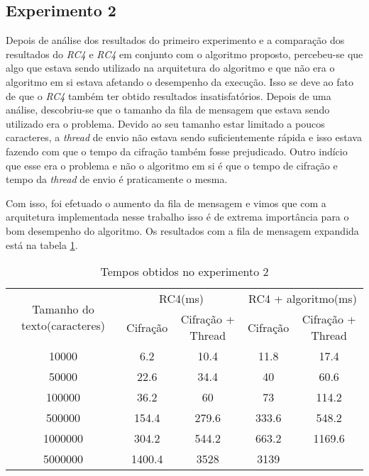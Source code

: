 \subsection{Experimento 2}

Depois de análise dos resultados do primeiro experimento e a comparação dos resultados do \textit{RC4} e \textit{RC4} em conjunto com o algoritmo proposto, percebeu-se que algo que estava sendo utilizado na arquitetura do algoritmo e que não era o algoritmo em si estava afetando o desempenho da execução. Isso se deve ao fato de que o \textit{RC4} também ter obtido resultados insatisfatórios. Depois de uma análise, descobriu-se que o tamanho da fila de mensagem que estava sendo utilizado era o problema. Devido ao seu tamanho estar limitado a poucos caracteres, a \textit{thread} de envio não estava sendo suficientemente rápida  e isso estava fazendo com que o tempo da cifração também fosse prejudicado. Outro indício que esse era o problema e não o algoritmo em si é que o tempo de cifração e tempo da \textit{thread} de envio é praticamente o mesma. 

Com isso, foi efetuado o aumento da fila de mensagem e vimos que com a arquitetura implementada nesse trabalho isso é de extrema importância para o bom desempenho do algoritmo. Os resultados com a fila de mensagem expandida está na tabela \ref{results-experiment-2}.

\begin{table}[h]
\begin{tabular}{|c|c|c|c|c|}
\hline
\multirow{2}{3cm}{Tamanho do texto(caracteres)} & \multicolumn{2}{c|}{RC4(ms)}     & \multicolumn{2}{c|}{RC4 + algoritmo(ms)} \\ \cline{2-5} 
                                     & Cifração & Cifração + Thread & Cifração     & Cifração + Thread     \\ \hline
10000                                & 6.2      & 10.4              & 11.8         & 17.4                  \\ \hline
50000                                & 22.6     & 34.4              & 40           & 60.6                  \\ \hline
100000                               & 36.2     & 60                & 73           & 114.2                 \\ \hline
500000                               & 154.4    & 279.6             & 333.6        & 548.2                 \\ \hline
1000000                              & 304.2    & 544.2             & 663.2        & 1169.6                \\ \hline
5000000                              & 1400.4   & 3528              & 3139         &                       \\ \hline
\end{tabular}
\caption{Tempos obtidos no experimento 2}
\label{results-experiment-2}
\end{table}

